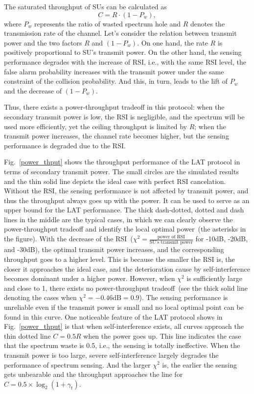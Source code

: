\documentclass[onecolumn,12pt]{IEEEtran}
\begin{document}
The saturated throughput of SUs can be calculated as
\begin{equation}\label{r_lat}
C = R \cdot \left( {1 - P_{w}} \right),
\end{equation}
where $P_{w}$ represents the ratio of wasted spectrum hole and $R$ denotes the transmission rate of the channel. Let's consider the relation between transmit power and the two factors $R$ and $\left(1-P_{w}\right)$. On one hand, the rate $R$ is positively proportional to SU's transmit power. On the other hand, the sensing performance degrades with the increase of RSI, i.e., with the same RSI level, the false alarm probability increases with the transmit power under the same constraint of the collision probability\cite{liao2014gc}. And this, in turn, leads to the lift of $P_w$ and the decrease of $\left(1-P_{w}\right)$.

Thus, there exists a power-throughput tradeoff in this protocol: when the secondary transmit power is low, the RSI is negligible, and the spectrum will be used more efficiently, yet the ceiling throughput is limited by $R$; when the transmit power increases, the channel rate becomes higher, but the sensing performance is degraded due to the RSI.




Fig.~\ref{power_thput} shows the throughput performance of the LAT protocol in terms of secondary transmit power. The small circles are the simulated results and the thin solid line depicts the ideal case with perfect RSI cancelation. Without the RSI, the sensing performance is not affected by transmit power, and thus the throughput always goes up with the power. It can be used to serve as an upper bound for the LAT performance. The thick dash-dotted, dotted and dash lines in the middle are the typical cases, in which we can clearly observe the power-throughput tradeoff and identify the local optimal power~(the asterisks in the figure). With the decrease of the RSI~($\chi^2=\frac{\text{power of RSI}}{\text{SU's transmit power}}$ for -10dB, -20dB, and -30dB), the optimal transmit power increases, and the corresponding throughput goes to a higher level. This is because the smaller the RSI is, the closer it approaches the ideal case, and the deterioration cause by self-interference becomes dominant under a higher power. However, when $\chi^2$ is sufficiently large and close to 1, there exists no power-throughput tradeoff~(see the thick solid line denoting the cases when $\chi^2 = -0.46\text{dB} = 0.9$). The sensing performance is unreliable even if the transmit power is small and no local optimal point can be found in this curve. One noticeable feature of the LAT protocol shows in Fig.~\ref{power_thput} is that when self-interference exists, all curves approach the thin dotted line $C = 0.5R$ when the power goes up. This line indicates the case that the spectrum waste is 0.5, i.e., the sensing is totally ineffective. When the transmit power is too large, severe self-interference largely degrades the performance of spectrum sensing. And the larger $\chi^2$ is, the earlier the sensing gets unbearable and the throughput approaches the line for $C=0.5\times \log_2(1+\gamma_t)$.
\end{document}
